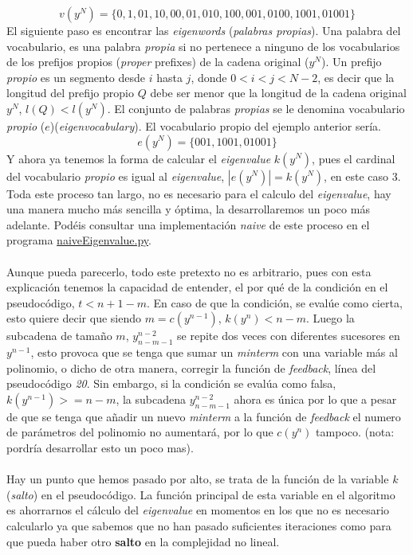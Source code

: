 \[v(y^{N}) = \{0, 1, 01, 10, 00, 01, 010, 100, 001, 0100, 1001, 01001 \}\]
El siguiente paso es encontrar las \textit{eigenwords} (\textit{palabras propias}). Una palabra del vocabulario, es una palabra \textit{propia} si no pertenece a ninguno de los vocabularios de los prefijos propios (\textit{proper} prefixes) de la cadena original ($y^{N}$). Un prefijo \textit{propio} es un segmento desde $i$ hasta $j$, donde $0 < i < j < N-2$, es decir que la longitud del prefijo propio $Q$ debe ser menor que la longitud de la cadena original $y^{N}$, $l(Q) < l(y^{N})$. El conjunto de palabras \textit{propias} se le denomina vocabulario \textit{propio} ($e$)(\textit{eigenvocabulary}). El vocabulario propio del ejemplo anterior sería.
\[e(y^{N}) = \{ 001, 1001, 01001 \}\]
Y ahora ya tenemos la forma de calcular el \textit{eigenvalue} $k(y^N)$, pues el cardinal del vocabulario \textit{propio} es igual al \textit{eigenvalue}, $|e(y^N)| = k(y^N)$, en este caso 3. Toda este proceso tan largo, no es necesario para el calculo del \textit{eigenvalue}, hay una manera mucho más sencilla y óptima, la desarrollaremos un poco más adelante. Podéis consultar una implementación \textit{naive} de este proceso en el programa \href{https://github.com/domingoUnican/TFGPedroCastro/blob/main/code/code_proofs/naive_eigenvalue.py}{naiveEigenvalue.py}.\\\\ Aunque pueda parecerlo, todo este pretexto no es arbitrario, pues con esta explicación tenemos la capacidad de entender, el por qué de la condición en el pseudocódigo, $t < n + 1 - m$. En caso de que la condición, se evalúe como cierta, esto quiere decir que siendo $m = c(y^{n-1})$, $k(y^n) < n - m$. Luego la subcadena de tamaño $m$, $y^{n-2}_{n-m-1}$ se repite dos veces con diferentes sucesores en $y^{n-1}$, esto provoca que se tenga que sumar un \textit{minterm} con una variable más al polinomio, o dicho de otra manera, corregir la función de \textit{feedback}, línea del pseudocódigo \textit{20}. Sin embargo, si la condición se evalúa como falsa, $k(y^{n-1}) >= n - m$, la subcadena $y^{n-2}_{n-m-1}$ ahora es única por lo que a pesar de que se tenga que añadir un nuevo \textit{minterm} a la función de \textit{feedback} el numero de parámetros del polinomio no aumentará, por lo que $c(y^n)$ tampoco. (nota: pordría desarrollar esto un poco mas).\\\\
Hay un punto que hemos pasado por alto, se trata de la función de la variable $k$ (\textit{salto}) en el pseudocódigo. La función principal de esta variable en el algoritmo es ahorrarnos el cálculo del \textit{eigenvalue} en momentos en los que no es necesario calcularlo ya que sabemos que no han pasado suficientes iteraciones como para que pueda haber otro \textbf{salto} en la complejidad no lineal.\\\\

